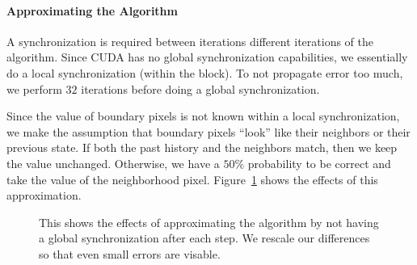 \documentclass[
10pt, %
letterpaper, %
oneside, %
headinclude,footinclude, %
BCOR5mm, %
]{scrartcl}
\begin{document}
\paragraph{Approximating the Algorithm}
A synchronization is required between iterations different iterations of the algorithm.
Since CUDA has no global synchronization capabilities, we essentially do a local 
  synchronization (within the block).
To not propagate error too much, we perform $32$ iterations before doing a global synchronization.

Since the value of boundary pixels is not known within a local synchronization, we 
  make the assumption that boundary pixels ``look'' like their neighbors or their 
  previous state.
If both the past history and the neighbors match, then we keep the value unchanged.
Otherwise, we have a $50\%$ probability to be correct and take the value of the
  neighborhood pixel.
Figure~\ref{fig:approx} shows the effects of this approximation.


\begin{figure}[tb]
\centering
{} \quad%
 \quad%
\caption{This shows the effects of approximating the algorithm by not having a global synchronization after each step. We rescale our differences so that even small errors are visable.}
\label{fig:approx}
\end{figure}
\end{document}
